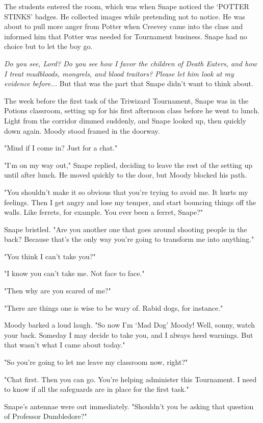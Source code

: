 The students entered the room, which was when Snape noticed the `POTTER STINKS' badges. He collected images while pretending not to notice. He was about to pull more anger from Potter when Creevey came into the class and informed him that Potter was needed for Tournament business. Snape had no choice but to let the boy go.

\emph{Do you see, Lord? Do you see how I favor the children of Death Eaters, and how I treat mudbloods, mongrels, and blood traitors? Please let him look at my evidence before...} But that was the part that Snape didn't want to think about.

The week before the first task of the Triwizard Tournament, Snape was in the Potions classroom, setting up for his first afternoon class before he went to lunch. Light from the corridor dimmed suddenly, and Snape looked up, then quickly down again. Moody stood framed in the doorway.

"Mind if I come in? Just for a chat."

"I'm on my way out," Snape replied, deciding to leave the rest of the setting up until after lunch. He moved quickly to the door, but Moody blocked his path.

"You shouldn't make it so obvious that you're trying to avoid me. It hurts my feelings. Then I get angry and lose my temper, and start bouncing things off the walls. Like ferrets, for example. You ever been a ferret, Snape?"

Snape bristled. "Are you another one that goes around shooting people in the back? Because that's the only way you're going to transform me into anything."

"You think I can't take you?"

"I know you can't take me. Not face to face."

"Then why are you scared of me?"

"There are things one is wise to be wary of. Rabid dogs, for instance."

Moody barked a loud laugh. "So now I'm `Mad Dog' Moody! Well, sonny, watch your back. Someday I may decide to take you, and I always heed warnings. But that wasn't what I came about today."

"So you're going to let me leave my classroom now, right?"

"Chat first. Then you can go. You're helping administer this Tournament. I need to know if all the safeguards are in place for the first task."

Snape's antennae were out immediately. "Shouldn't you be asking that question of Professor Dumbledore?"

